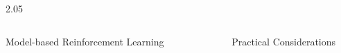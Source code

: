 \documentclass[final,12pt]{beamer}
\newlength{\sepwidth}
\newlength{\colwidth}
\newcommand{\separatorcolumn}{\begin{column}{\sepwidth}\end{column}}
\newlength\figureheight
\newlength\figurewidth
\newcommand{\our}{SFR}
\begin{document}
\begin{frame}[t]
\begin{columns}[t]
\begin{column}{2.05\colwidth}
\begin{columns}[t]
\begin{column}{\colwidth}
\begin{block}{Model-based Reinforcement Learning}

    \end{block}

\end{column}

\separatorcolumn

\begin{column}{\colwidth}

  \begin{block}{Practical Considerations}


\end{block}
\end{column}
\end{columns}
\end{column}
\end{columns}
\end{frame}
\end{document}
